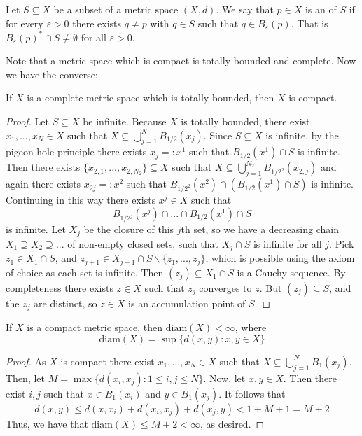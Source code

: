 \begin{defn}
    Let $S \subseteq X$ be a subset of a metric space $(X,d)$. We say that $p \in X$ is an  of $S$ if for every $\varepsilon > 0$ there exists $q \neq p$ with $q \in S$ such that $q \in B_{\varepsilon}(p)$. That is $B_{\varepsilon}(p)^*\cap S \neq \emptyset$ for all $\varepsilon > 0$.
\end{defn}


Note that a metric space which is compact is totally bounded and complete. Now we have the converse:

\begin{prop}\label{prop:2.3.7}
    If $X$ is a complete metric space which is totally bounded, then $X$ is compact.
\end{prop}
\begin{proof}
    Let $S \subseteq X$ be infinite. Because $X$ is totally bounded, there exist $x_1,...,x_N \in X$ such that $X \subseteq \bigcup_{j=1}^NB_{1/2}(x_j)$. Since $S \subseteq X$ is infinite, by the pigeon hole principle there exists $x_j =: x^1$ such that $B_{1/2}(x^1)\cap S$ is infinite. Then there exists $\{x_{2,1},...,x_{2,N_2}\} \subseteq X$ such that $X \subseteq \bigcup_{j=1}^{N_2}B_{1/2^2}(x_{2,j})$ and again there exists $x_{2j} =: x^2$ such that $B_{1/2^2}(x^2) \cap (B_{1/2}(x^1)\cap S)$ is infinite. Continuing in this way there exists $x^j \in X$ such that \begin{equation*}
        B_{1/2^j}(x^j)\cap ... \cap B_{1/2}(x^1)\cap S
    \end{equation*}
    is infinite. Let $X_j$ be the closure of this $j$th set, so we have a decreasing chain $X_1 \supseteq X_2 \supseteq ...$ of non-empty closed sets, such that $X_j \cap S$ is infinite for all $j$. Pick $z_1\in X_1\cap S$, and $z_{j+1} \in X_{j+1}\cap S\backslash \{z_1,...,z_j\}$, which is possible using the axiom of choice as each set is infinite. Then $(z_j) \subseteq X_1 \cap S$ is a Cauchy sequence. By completeness there exists $z \in X$ such that $z_j$ converges to $z$. But $(z_j) \subseteq S$, and the $z_j$ are distinct, so $z \in X$ is an accumulation point of $S$.
\end{proof}

\begin{prop}\label{prop:2.3.8}
    If $X$ is a compact metric space, then $\text{diam}(X) < \infty$, where \begin{equation*}
        \text{diam}(X) = \sup\{d(x,y):x,y \in X\}
    \end{equation*}
\end{prop}
\begin{proof}
     As $X$ is compact there exist $x_1,...,x_N \in X$ such that $X \subseteq \bigcup_{j=1}^NB_1(x_j)$. Then, let $M = \max\{d(x_i,x_j):1\leq i,j\leq N\}$. Now, let $x,y \in X$. Then there exist $i,j$ such that $x \in B_1(x_i)$ and $y \in B_1(x_j)$. It follows that $$d(x,y) \leq d(x,x_i) + d(x_i,x_j) + d(x_j,y) < 1+M+1 = M+2$$ Thus, we have that $\text{diam}(X) \leq M+2 < \infty$, as desired.
\end{proof}

